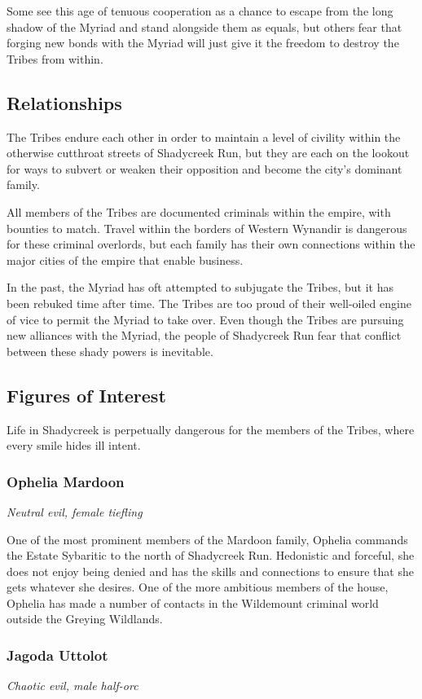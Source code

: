 \documentclass[10pt,a4paper,twoside,bg=print,twocolumn,openany,nodeprecatedcode]{dndbook}
\begin{document}
Some see this age of tenuous cooperation as a chance to escape from the long shadow of the Myriad and stand alongside them as equals, but others fear that forging new bonds with the Myriad will just give it the freedom to destroy the Tribes from within.

\subsection{Relationships}
The Tribes endure each other in order to maintain a level of civility within the otherwise cutthroat streets of Shadycreek Run, but they are each on the lookout for ways to subvert or weaken their opposition and become the city's dominant family.

All members of the Tribes are documented criminals within the empire, with bounties to match. Travel within the borders of Western Wynandir is dangerous for these criminal overlords, but each family has their own connections within the major cities of the empire that enable business.

In the past, the Myriad has oft attempted to subjugate the Tribes, but it has been rebuked time after time. The Tribes are too proud of their well-oiled engine of vice to permit the Myriad to take over. Even though the Tribes are pursuing new alliances with the Myriad, the people of Shadycreek Run fear that conflict between these shady powers is inevitable.

\subsection{Figures of Interest}
Life in Shadycreek is perpetually dangerous for the members of the Tribes, where every smile hides ill intent.

\subsubsection{Ophelia Mardoon}
\textit{Neutral evil, female tiefling}

One of the most prominent members of the Mardoon family, Ophelia commands the Estate Sybaritic to the north of Shadycreek Run. Hedonistic and forceful, she does not enjoy being denied and has the skills and connections to ensure that she gets whatever she desires. One of the more ambitious members of the house, Ophelia has made a number of contacts in the Wildemount criminal world outside the Greying Wildlands.

\subsubsection{Jagoda Uttolot}
\textit{Chaotic evil, male half-orc}
\end{document}
